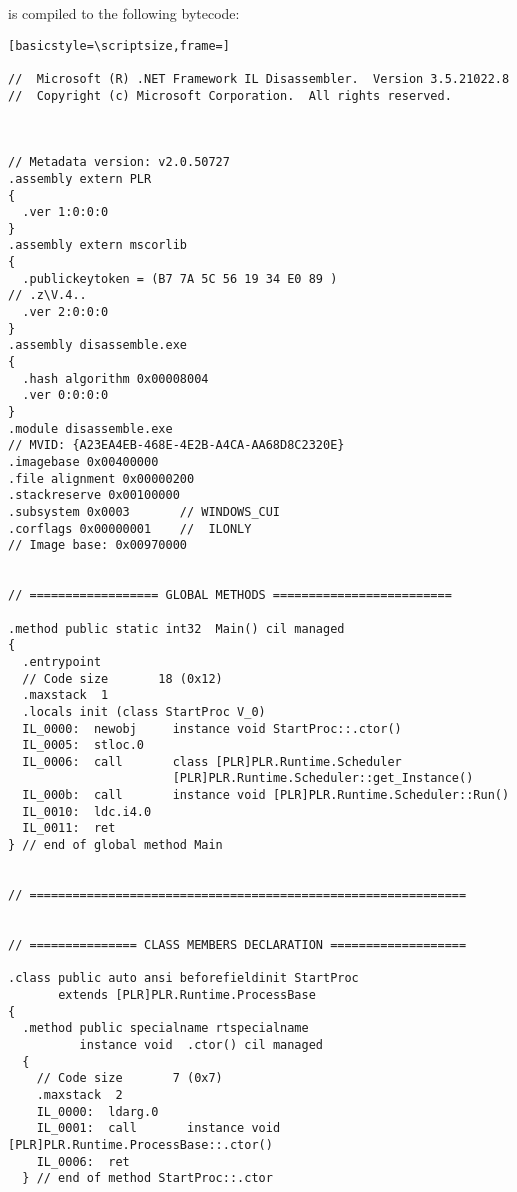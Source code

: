 	is compiled to the following bytecode:
	
	\begin{lstlisting}[basicstyle=\scriptsize,frame=]

//  Microsoft (R) .NET Framework IL Disassembler.  Version 3.5.21022.8
//  Copyright (c) Microsoft Corporation.  All rights reserved.



// Metadata version: v2.0.50727
.assembly extern PLR
{
  .ver 1:0:0:0
}
.assembly extern mscorlib
{
  .publickeytoken = (B7 7A 5C 56 19 34 E0 89 )                         // .z\V.4..
  .ver 2:0:0:0
}
.assembly disassemble.exe
{
  .hash algorithm 0x00008004
  .ver 0:0:0:0
}
.module disassemble.exe
// MVID: {A23EA4EB-468E-4E2B-A4CA-AA68D8C2320E}
.imagebase 0x00400000
.file alignment 0x00000200
.stackreserve 0x00100000
.subsystem 0x0003       // WINDOWS_CUI
.corflags 0x00000001    //  ILONLY
// Image base: 0x00970000


// ================== GLOBAL METHODS =========================

.method public static int32  Main() cil managed
{
  .entrypoint
  // Code size       18 (0x12)
  .maxstack  1
  .locals init (class StartProc V_0)
  IL_0000:  newobj     instance void StartProc::.ctor()
  IL_0005:  stloc.0
  IL_0006:  call       class [PLR]PLR.Runtime.Scheduler 
                       [PLR]PLR.Runtime.Scheduler::get_Instance()
  IL_000b:  call       instance void [PLR]PLR.Runtime.Scheduler::Run()
  IL_0010:  ldc.i4.0
  IL_0011:  ret
} // end of global method Main


// =============================================================


// =============== CLASS MEMBERS DECLARATION ===================

.class public auto ansi beforefieldinit StartProc
       extends [PLR]PLR.Runtime.ProcessBase
{
  .method public specialname rtspecialname 
          instance void  .ctor() cil managed
  {
    // Code size       7 (0x7)
    .maxstack  2
    IL_0000:  ldarg.0
    IL_0001:  call       instance void [PLR]PLR.Runtime.ProcessBase::.ctor()
    IL_0006:  ret
  } // end of method StartProc::.ctor


\end{lstlisting}

